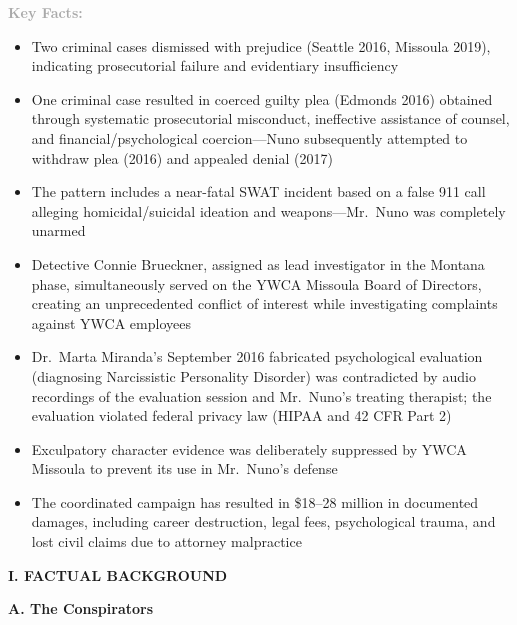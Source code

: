 \documentclass[11pt, letterpaper]{article}
\newcommand{\sectiontitle}[1]{\vspace{0.2in}\noindent\textcolor{NavyBlue}{\large\textbf{#1}}\vspace{0.1in}}
\newcommand{\subsectiontitle}[1]{\vspace{0.15in}\noindent\textcolor{NavyBlue}{\textbf{#1}}\vspace{0.05in}}
\newcommand{\subsubsectiontitle}[1]{\vspace{0.1in}\noindent\textcolor{DarkGray}{\textbf{#1}}\vspace{0.05in}}
\begin{document}
\subsubsectiontitle{Key Facts:}
\begin{itemize}[leftmargin=*,itemsep=3pt]
    \item Two criminal cases dismissed with prejudice (Seattle 2016, Missoula 2019), indicating prosecutorial failure and evidentiary insufficiency
    \item One criminal case resulted in coerced guilty plea (Edmonds 2016) obtained through systematic prosecutorial misconduct, ineffective assistance of counsel, and financial/psychological coercion---Nuno subsequently attempted to withdraw plea (2016) and appealed denial (2017)
    \item The pattern includes a near-fatal SWAT incident based on a false 911 call alleging homicidal/suicidal ideation and weapons---Mr.\ Nuno was completely unarmed
    \item Detective Connie Brueckner, assigned as lead investigator in the Montana phase, simultaneously served on the YWCA Missoula Board of Directors, creating an unprecedented conflict of interest while investigating complaints against YWCA employees
    \item Dr.\ Marta Miranda's September 2016 fabricated psychological evaluation (diagnosing Narcissistic Personality Disorder) was contradicted by audio recordings of the evaluation session and Mr.\ Nuno's treating therapist; the evaluation violated federal privacy law (HIPAA and 42 CFR Part 2)
    \item Exculpatory character evidence was deliberately suppressed by YWCA Missoula to prevent its use in Mr.\ Nuno's defense
    \item The coordinated campaign has resulted in \$18--28 million in documented damages, including career destruction, legal fees, psychological trauma, and lost civil claims due to attorney malpractice
\end{itemize}

\sectiontitle{I. FACTUAL BACKGROUND}

\subsectiontitle{A. The Conspirators}
\end{document}
